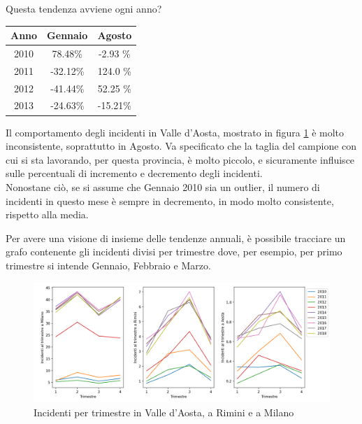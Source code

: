\documentclass[a4paper]{report}
\begin{document}
Questa tendenza avviene ogni anno?

\begin{center}
    \def\arraystretch{1.5}%
    \begin{tabular}{ |c|c|c| } 
    \hline
    Anno & Gennaio & Agosto \\ 
    \hline
    \rowcolor{TableGray}
    2010 & 78.48\%  & -2.93 \%\\ 
    2011 & -32.12\% & 124.0 \%\\
    \rowcolor{TableGray}
    2012 & -41.44\% & 52.25 \% \\
    2013 & -24.63\% & -15.21\% \\
    \hline
    \end{tabular}
\end{center}

Il comportamento degli incidenti in Valle d'Aosta, mostrato in figura 
\ref{fig:aosta-rimini-milano-trimestre} è molto inconsistente, soprattutto in Agosto.
Va specificato che la taglia del campione con cui si sta lavorando, per questa provincia, 
è molto piccolo, e sicuramente influisce sulle percentuali di incremento e decremento 
degli incidenti.\\
Nonostane ciò, se si assume che Gennaio 2010 sia un outlier, il numero di incidenti in 
questo mese è sempre in decremento, in modo molto consistente, rispetto alla media.

Per avere una visione di insieme delle tendenze annuali, è possibile tracciare un grafo contenente 
gli incidenti divisi per trimestre dove, per esempio, per primo trimestre si intende Gennaio, 
Febbraio e Marzo.

\begin{figure}
    \includegraphics[width=\linewidth]{../src/incidenti/incidenti_senza_coords/mese_incidenti/trimestri_aosta_milano_rimini.png}
    \caption{Incidenti per trimestre in Valle d'Aosta, a Rimini e a Milano}
    \label{fig:aosta-rimini-milano-trimestre}
\end{figure}
\end{document}
